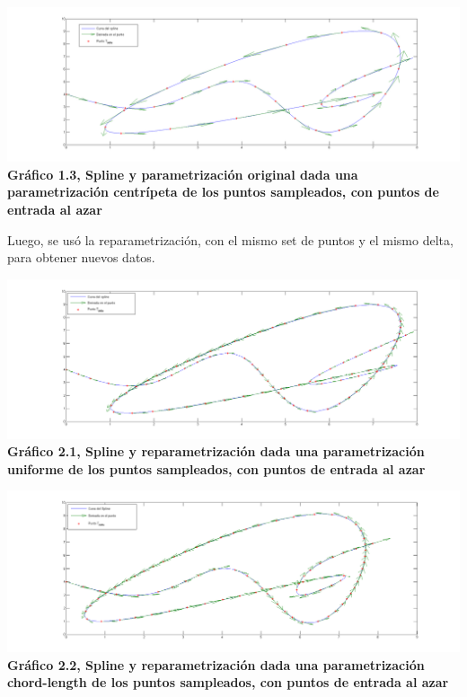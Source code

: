 \begin{center}
\includegraphics[scale=0.4]{../img/Centripeta-orig-rand.png} \\
\scriptsize{\textsf{\textbf{Gr\'afico 1.3, Spline y parametrización original dada una parametrización centrípeta de los puntos sampleados, con puntos de entrada al azar}}}
\end{center}


Luego, se usó la reparametrización, con el mismo set de puntos y el mismo delta, para obtener nuevos datos.


\begin{center}
\includegraphics[scale=0.4]{../img/Uniforme-repa-rand.png} \\
\scriptsize{\textsf{\textbf{Gr\'afico 2.1, Spline y reparametrización dada una parametrización uniforme de los puntos sampleados, con puntos de entrada al azar}}}
\end{center}

\begin{center}
\includegraphics[scale=0.4]{../img/Chord-repa-rand.png} \\
\scriptsize{\textsf{\textbf{Gr\'afico 2.2, Spline y reparametrización dada una parametrización chord-length de los puntos sampleados, con puntos de entrada al azar}}}
\end{center}

